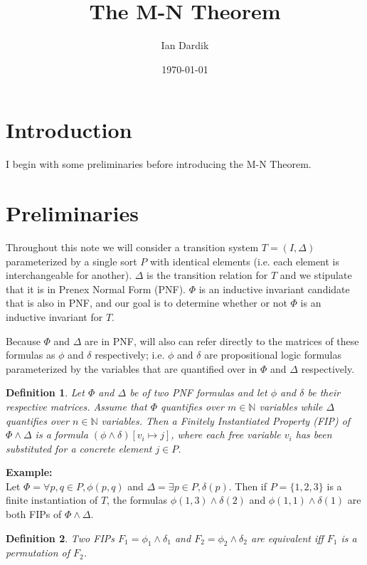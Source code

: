 \documentclass[12pt]{article}
\title{The M-N Theorem}
\author{Ian Dardik}
\date{\today}
\newtheorem{definition}{Definition}
\begin{document}
\maketitle

\section{Introduction}
I begin with some preliminaries before introducing the M-N Theorem.


\section{Preliminaries}
Throughout this note we will consider a transition system $T=(I,\Delta)$ parameterized by a single sort $P$ with identical elements (i.e. each element is interchangeable for another).  $\Delta$ is the transition relation for $T$ and we stipulate that it is in Prenex Normal Form (PNF).  $\Phi$ is an inductive invariant candidate that is also in PNF, and our goal is to determine whether or not $\Phi$ is an inductive invariant for $T$.

Because $\Phi$ and $\Delta$ are in PNF, will also can refer directly to the matrices of these formulas as $\phi$ and $\delta$ respectively; i.e. $\phi$ and $\delta$ are propositional logic formulas parameterized by the variables that are quantified over in $\Phi$ and $\Delta$ respectively.

\begin{definition}
  Let $\Phi$ and $\Delta$ be of two PNF formulas and let $\phi$ and $\delta$ be their respective matrices.  Assume that $\Phi$ quantifies over $m \in \mathbb{N}$ variables while $\Delta$ quantifies over $n \in \mathbb{N}$ variables.  Then a Finitely Instantiated Property (FIP) of $\Phi \land \Delta$ is a formula $(\phi \land \delta) [v_i \mapsto j]$, where each free variable $v_i$ has been substituted for a concrete element $j \in P$.  
\end{definition}

\noindent \textbf{Example:}\\
Let $\Phi = \forall p,q \in P, \phi(p,q)$ and $\Delta = \exists p \in P, \delta(p)$.  Then if $P= \{1,2,3\}$ is a finite instantiation of $T$, the formulas $\phi(1,3) \land \delta(2)$ and $\phi(1,1) \land \delta(1)$ are both FIPs of $\Phi \land \Delta$.

\begin{definition}
  Two FIPs $F_1 = \phi_1 \land \delta_1$ and $F_2 = \phi_2 \land \delta_2$ are equivalent iff $F_1$ is a permutation of $F_2$.
\end{definition}
\end{document}
